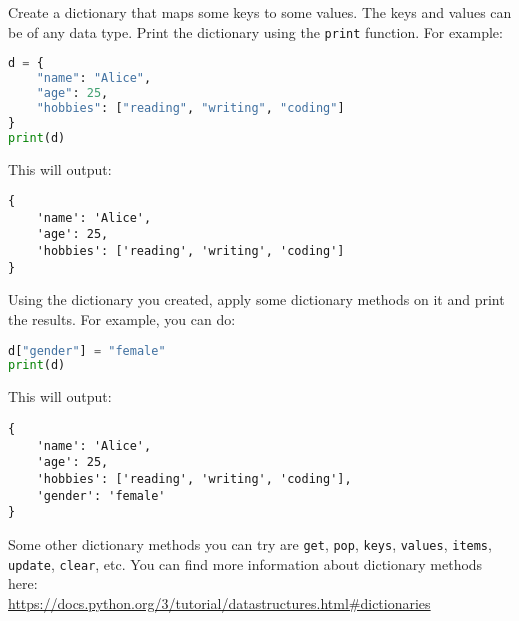 \documentclass{homework}
\begin{document}
\newpage
\begin{problem}

Create a dictionary that maps some keys to some values. The keys and values can be of any data type. Print the dictionary using the \texttt{print} function. For example:

\begin{lstlisting}[language=Python]
d = {
    "name": "Alice", 
    "age": 25, 
    "hobbies": ["reading", "writing", "coding"]
}
print(d)
\end{lstlisting}

This will output:

\begin{lstlisting}[style=output]
{
    'name': 'Alice', 
    'age': 25, 
    'hobbies': ['reading', 'writing', 'coding']
}
\end{lstlisting}

Using the dictionary you created, apply some dictionary methods on it and print the results. For example, you can do:

\begin{lstlisting}[language=Python]
d["gender"] = "female"
print(d)
\end{lstlisting}

This will output:

\begin{lstlisting}[style=output]
{
    'name': 'Alice', 
    'age': 25, 
    'hobbies': ['reading', 'writing', 'coding'], 
    'gender': 'female'
}
\end{lstlisting}

Some other dictionary methods you can try are \texttt{get}, \texttt{pop}, \texttt{keys}, \texttt{values}, \texttt{items}, \texttt{update}, \texttt{clear}, etc. You can find more information about dictionary methods here:\\

\url{https://docs.python.org/3/tutorial/datastructures.html#dictionaries}

\end{problem}
\end{document}
